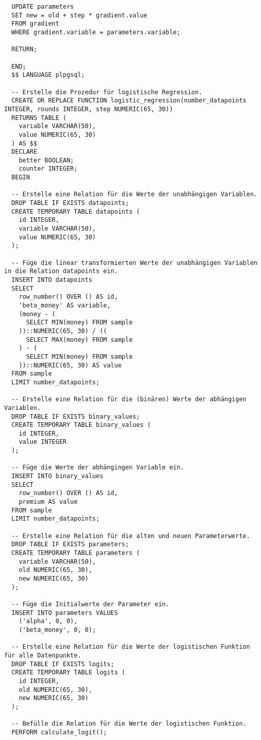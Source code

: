 \begin{verbatim}
  UPDATE parameters
  SET new = old + step * gradient.value
  FROM gradient
  WHERE gradient.variable = parameters.variable;

  RETURN;

  END;
  $$ LANGUAGE plpgsql;

  -- Erstelle die Prozedur für logistische Regression.
  CREATE OR REPLACE FUNCTION logistic_regression(number_datapoints INTEGER, rounds INTEGER, step NUMERIC(65, 30))
  RETURNS TABLE (
    variable VARCHAR(50),
    value NUMERIC(65, 30)
  ) AS $$
  DECLARE
    better BOOLEAN;
    counter INTEGER;
  BEGIN

  -- Erstelle eine Relation für die Werte der unabhängigen Variablen.
  DROP TABLE IF EXISTS datapoints;
  CREATE TEMPORARY TABLE datapoints (
    id INTEGER,
    variable VARCHAR(50),
    value NUMERIC(65, 30)
  );

  -- Füge die linear transformierten Werte der unabhängigen Variablen in die Relation datapoints ein.
  INSERT INTO datapoints
  SELECT
    row_number() OVER () AS id,
    'beta_money' AS variable,
    (money - (
      SELECT MIN(money) FROM sample
    ))::NUMERIC(65, 30) / ((
      SELECT MAX(money) FROM sample
    ) - (
      SELECT MIN(money) FROM sample
    ))::NUMERIC(65, 30) AS value
  FROM sample
  LIMIT number_datapoints;

  -- Erstelle eine Relation für die (binären) Werte der abhängigen Variablen.
  DROP TABLE IF EXISTS binary_values;
  CREATE TEMPORARY TABLE binary_values (
    id INTEGER,
    value INTEGER
  );

  -- Füge die Werte der abhängingen Variable ein.
  INSERT INTO binary_values
  SELECT
    row_number() OVER () AS id,
    premium AS value
  FROM sample
  LIMIT number_datapoints;

  -- Erstelle eine Relation für die alten und neuen Parameterwerte.
  DROP TABLE IF EXISTS parameters;
  CREATE TEMPORARY TABLE parameters (
    variable VARCHAR(50),
    old NUMERIC(65, 30),
    new NUMERIC(65, 30)
  );

  -- Füge die Initialwerte der Parameter ein.
  INSERT INTO parameters VALUES
    ('alpha', 0, 0),
    ('beta_money', 0, 0);

  -- Erstelle eine Relation für die Werte der logistischen Funktion für alle Datenpunkte.
  DROP TABLE IF EXISTS logits;
  CREATE TEMPORARY TABLE logits (
    id INTEGER,
    old NUMERIC(65, 30),
    new NUMERIC(65, 30)
  );

  -- Befülle die Relation für die Werte der logistischen Funktion.
  PERFORM calculate_logit();


\end{verbatim}
